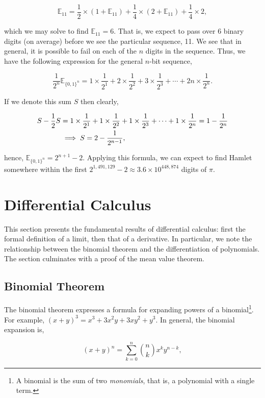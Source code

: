\documentclass[11pt]{amsart}
\begin{document}
$$\mathbb{E}_{11} = \frac{1}{2}\times(1 + \mathbb{E}_{11}) + \frac{1}{4}\times (2 + \mathbb{E}_{11}) + \frac{1}{4}\times 2,$$

which we may solve to find $\mathbb{E}_{11} = 6$. That is, we expect to pass over $6$ binary digits (on average) before we see the particular sequence, 11. We see that in general, it is possible to fail on each of the $n$ digits in the sequence. Thus, we have the following expression for the general $n$-bit sequence,

$$\frac{1}{2^n}\mathbb{E}_{\{0, 1\}^n} = 1\times\frac{1}{2^1} + 2\times\frac{1}{2^2} + 3\times\frac{1}{2^3} + \cdots + 2n\times\frac{1}{2^{n}}.$$

If we denote this sum $S$ then clearly,

\begin{align}
S - \frac{1}{2}S &= 1\times\frac{1}{2^1} + 1\times\frac{1}{2^2} + 1\times\frac{1}{2^3} + \cdots + 1\times\frac{1}{2^{n}} = 1 - \frac{1}{2^{n}} \notag \\
&\implies S = 2 - \frac{1}{2^{n-1}}, \notag
\end{align}

hence, $\mathbb{E}_{\{0, 1\}^n} = 2^{n+1} - 2$. Applying this formula, we can expect to find Hamlet somewhere within the first $2^{1,491,129} - 2 \approx 3.6\times10^{448,874}$ digits of $\pi$.

\section{Differential Calculus}

This section presents the fundamental results of differential calculus: first the formal definition of a limit, then that of a derivative. In particular, we note the relationship between the binomial theorem and the differentiation of polynomials. The section culminates with a proof of the mean value theorem.

\subsection{Binomial Theorem}

The binomial theorem expresses a formula for expanding powers of a binomial\footnote{A binomial is the sum of two \emph{monomials}, that is, a polynomial with a single term.}. For example, $(x + y)^3 = x^3 + 3x^2y + 3xy^2 + y^3$. In general, the binomial expansion is,

$$(x + y)^n = \sum_{k = 0}^{n}{{n}\choose{k}}x^ky^{n-k},$$
\end{document}
